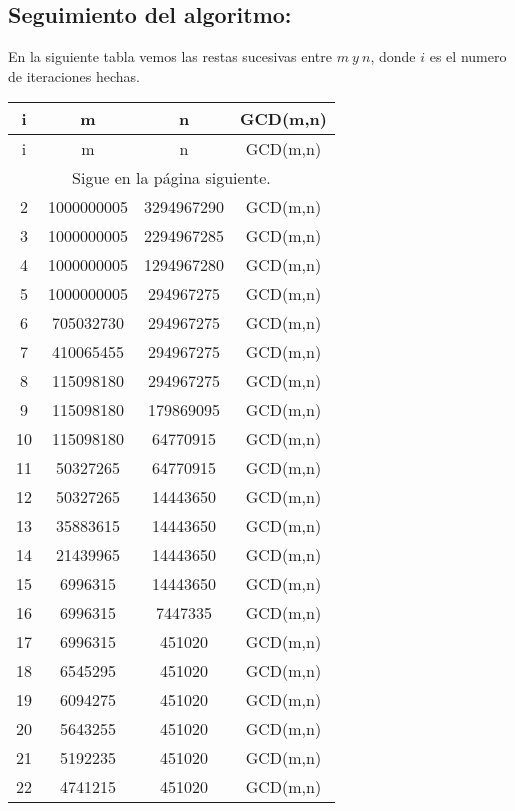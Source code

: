 \subsection{Seguimiento del algoritmo:}
En la siguiente tabla vemos las restas sucesivas entre $m\:y\:n$, donde $i$ es el numero de iteraciones hechas.
\begin{longtable}{c|c|c|c}
\hline
i & m & n & GCD(m,n) \\
\hline \hline
\endfirsthead
\hline
i & m & n & GCD(m,n) \\
\hline \hline
\endhead
\multicolumn{4}{c}{Sigue en la página siguiente.}
\endfoot
\endlastfoot
1&4294967295&3294967290&GCD(m,n)\\\hline
2&1000000005&3294967290&GCD(m,n)\\\hline
3&1000000005&2294967285&GCD(m,n)\\\hline
4&1000000005&1294967280&GCD(m,n)\\\hline
5&1000000005&294967275&GCD(m,n)\\\hline
6&705032730&294967275&GCD(m,n)\\\hline
7&410065455&294967275&GCD(m,n)\\\hline
8&115098180&294967275&GCD(m,n)\\\hline
9&115098180&179869095&GCD(m,n)\\\hline
10&115098180&64770915&GCD(m,n)\\\hline
11&50327265&64770915&GCD(m,n)\\\hline
12&50327265&14443650&GCD(m,n)\\\hline
13&35883615&14443650&GCD(m,n)\\\hline
14&21439965&14443650&GCD(m,n)\\\hline
15&6996315&14443650&GCD(m,n)\\\hline
16&6996315&7447335&GCD(m,n)\\\hline
17&6996315&451020&GCD(m,n)\\\hline
18&6545295&451020&GCD(m,n)\\\hline
19&6094275&451020&GCD(m,n)\\\hline
20&5643255&451020&GCD(m,n)\\\hline
21&5192235&451020&GCD(m,n)\\\hline
22&4741215&451020&GCD(m,n)\\\hline

\end{longtable}
